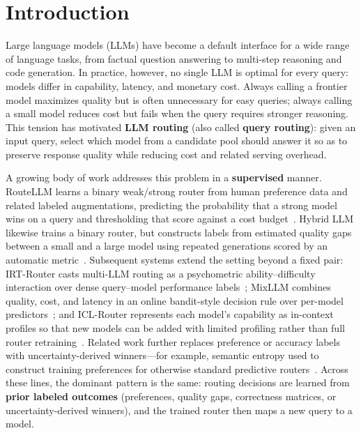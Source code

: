 \section{Introduction}
\label{sec:intro}

Large language models (LLMs) have become a default interface for a wide range of language tasks, from factual question answering to multi-step reasoning and code generation.
In practice, however, no single LLM is optimal for every query: models differ in capability, latency, and monetary cost.
Always calling a frontier model maximizes quality but is often unnecessary for easy queries; always calling a small model reduces cost but fails when the query requires stronger reasoning.
This tension has motivated \textbf{LLM routing} (also called \textbf{query routing}): given an input query, select which model from a candidate pool should answer it so as to preserve response quality while reducing cost and related serving overhead.

A growing body of work addresses this problem in a \textbf{supervised} manner.
RouteLLM learns a binary weak/strong router from human preference data and related labeled augmentations, predicting the probability that a strong model wins on a query and thresholding that score against a cost budget~\cite{ong2025routellm}.
Hybrid LLM likewise trains a binary router, but constructs labels from estimated quality gaps between a small and a large model using repeated generations scored by an automatic metric~\cite{ding2024hybrid}.
Subsequent systems extend the setting beyond a fixed pair: IRT-Router casts multi-LLM routing as a psychometric ability--difficulty interaction over dense query--model performance labels~\cite{song2025irt}; MixLLM combines quality, cost, and latency in an online bandit-style decision rule over per-model predictors~\cite{wang2025mixllm}; and ICL-Router represents each model's capability as in-context profiles so that new models can be added with limited profiling rather than full router retraining~\cite{wang2025icl}.
Related work further replaces preference or accuracy labels with uncertainty-derived winners---for example, semantic entropy used to construct training preferences for otherwise standard predictive routers~\cite{zhang2025uncertainty}.
Across these lines, the dominant pattern is the same: routing decisions are learned from \textbf{prior labeled outcomes} (preferences, quality gaps, correctness matrices, or uncertainty-derived winners), and the trained router then maps a new query to a model.


